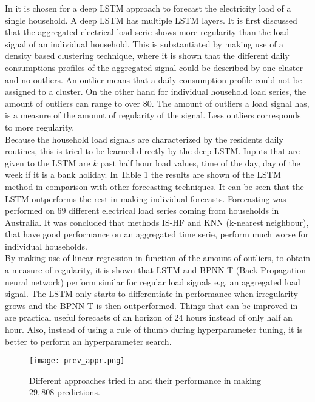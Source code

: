 In \cite{Kong2019} it is chosen for a deep LSTM approach to forecast the electricity load of a single household. A deep LSTM has multiple LSTM layers. It is first discussed that the aggregated electrical load serie shows more regularity than the load signal of an individual household.  This is substantiated by making use of a density based clustering technique, where it is shown that the different daily consumptions profiles of the aggregated signal could be described by one cluster and no outliers. An outlier means that a daily consumption profile could not be assigned to a cluster. On the other hand for individual household load series, the amount of outliers can range to over $ 80 $. The amount of outliers a load signal has, is a measure of the amount of regularity of the signal. Less outliers corresponds to more regularity.\\
Because the household load signals are characterized by the residents daily routines, this is tried to be learned directly by the deep LSTM.
Inputs that are given to the LSTM are $ k $ past half hour load values, time of the day, day of the week if it is a bank holiday. In Table \ref{tab:LSTM_lit_result} the results are shown of the LSTM method in comparison with other forecasting techniques. It can be seen that the LSTM outperforms the rest in making individual forecasts. Forecasting was performed on $ 69 $ different electrical load series coming from households in Australia. It was concluded that methods IS-HF and KNN (k-nearest neighbour), that have good performance on an aggregated time serie, perform much worse for individual households. \\
By making use of linear regression in function of the amount of outliers, to obtain a measure of regularity, it is shown that LSTM and BPNN-T (Back-Propagation neural network) perform similar for regular load signals e.g. an aggregated load signal. The LSTM only starts to differentiate in performance when irregularity grows and the BPNN-T is then outperformed. Things that can be improved in \cite{Kong2019} are practical useful forecasts of an horizon of $ 24 $ hours instead of only half an hour. Also, instead of using a rule of thumb during hyperparameter tuning, it is better to perform an hyperparameter search.\\

\begin{figure}[h!]
	\centering
	\texttt{[image: prev\_appr.png]}
	\caption{Different approaches tried in \cite{Kong2019} and their performance in making $ 29,808 $ predictions.}
	\label{tab:LSTM_lit_result}
\end{figure}

